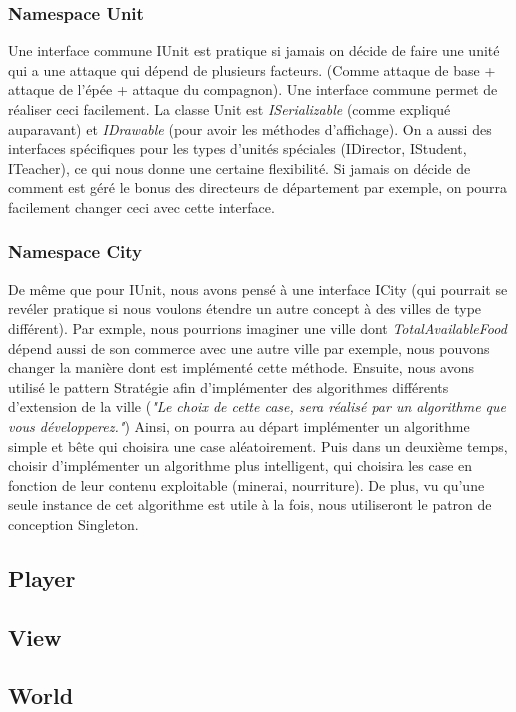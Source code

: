 		\subsubsection{Namespace Unit}
			Une interface commune IUnit est pratique si jamais on décide de faire une unité qui a une attaque qui dépend de plusieurs facteurs.
		(Comme attaque de base + attaque de l'épée + attaque du compagnon). Une interface commune permet de réaliser ceci facilement.
			La classe Unit est \textit{ISerializable} (comme expliqué auparavant) et \textit{IDrawable} (pour avoir les méthodes d'affichage).
		On a aussi des interfaces spécifiques pour les types d'unités spéciales (IDirector, IStudent, ITeacher), ce qui nous donne une certaine flexibilité.
			Si jamais on décide de comment est géré le bonus des directeurs de département par exemple, on pourra facilement changer ceci avec cette interface.
		
		\subsubsection{Namespace City}
			De même que pour IUnit, nous avons pensé à une interface ICity (qui pourrait se revéler pratique si nous voulons étendre un autre concept à des villes de type différent).
		Par exmple, nous pourrions imaginer une ville dont \textit{TotalAvailableFood} dépend aussi de son commerce avec une autre ville par exemple, nous pouvons changer la manière dont est implémenté cette méthode.
			Ensuite, nous avons utilisé le pattern Stratégie afin d'implémenter des algorithmes différents d'extension de la ville (\textit{"Le choix de cette case, sera réalisé par un algorithme que vous développerez."})
		Ainsi, on pourra au départ implémenter un algorithme simple et bête qui choisira une case aléatoirement.
			Puis dans un deuxième temps, choisir d'implémenter un algorithme plus intelligent, qui choisira les case en fonction de leur contenu exploitable (minerai, nourriture).
		De plus, vu qu'une seule instance de cet algorithme est utile à la fois, nous utiliseront le patron de conception Singleton.
			
		
	\subsection{Player}
	\subsection{View}
	\subsection{World}
